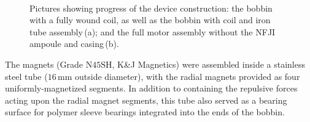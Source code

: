             
            \begin{figure}[h]
            \centering
            \\
            \caption{Pictures showing progress of the device construction: the bobbin with a fully wound coil, as well as the bobbin with coil and iron tube assembly\,(a); and the full motor assembly without the NFJI ampoule and casing\,(b).}
            \label{fig:chap/experiment/validation/construction/overall_construction}
            \end{figure}
            
            
            The magnets (Grade $\mathrm{N45SH}$, K\&J Magnetics) were assembled inside a stainless steel tube ($16\,\mathrm{mm}$ outside diameter), with the radial magnets provided as four uniformly-magnetized segments. In addition to containing the repulsive forces acting upon the radial magnet segments, this tube also served as a bearing surface for polymer sleeve bearings integrated into the ends of the bobbin.
    
